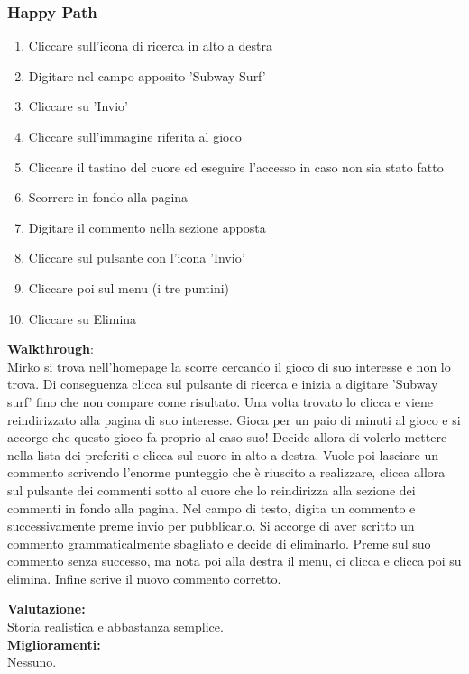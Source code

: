 \documentclass[../Report.tex]{subfiles}
\begin{document}
    \subsubsection{Happy Path}
\begin{enumerate}
    \item Cliccare sull'icona di ricerca in alto a destra
    \item Digitare nel campo apposito 'Subway Surf'
    \item Cliccare su 'Invio'
    \item Cliccare sull'immagine riferita al gioco
    \item Cliccare il tastino del cuore ed eseguire l'accesso in caso non sia stato fatto
    \item Scorrere in fondo alla pagina
    \item Digitare il commento nella sezione apposta
    \item Cliccare sul pulsante con l'icona 'Invio'
    \item Cliccare poi sul menu (i tre puntini)
    \item Cliccare su Elimina 
\end{enumerate}
\textbf{Walkthrough}:\\
    Mirko si trova nell'homepage la scorre cercando il gioco di suo interesse e non lo trova.
    Di conseguenza clicca sul pulsante di ricerca e inizia a digitare 'Subway surf' fino che non compare come risultato.
    Una volta trovato lo clicca e viene reindirizzato alla pagina di suo interesse.
    Gioca per un paio di minuti al gioco e si accorge che questo gioco fa proprio al caso suo! Decide allora di volerlo mettere nella lista dei preferiti e clicca sul cuore in alto a destra. Vuole poi lasciare un commento scrivendo l'enorme punteggio che è riuscito a realizzare, clicca allora sul pulsante dei commenti sotto al cuore che lo reindirizza alla sezione dei commenti in fondo alla pagina.
    Nel campo di testo, digita un commento e successivamente preme invio per pubblicarlo. Si accorge di aver scritto un commento grammaticalmente sbagliato e decide di eliminarlo. Preme sul suo commento senza successo, ma nota poi alla destra il menu, ci clicca e clicca poi su elimina. Infine scrive il nuovo commento corretto. 

    \textbf{Valutazione:}\\Storia  realistica e abbastanza semplice.\\

    \textbf{Miglioramenti:}\\Nessuno.
\end{document}

